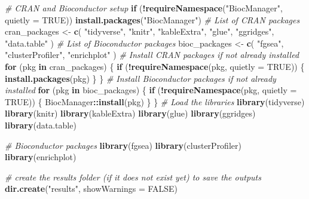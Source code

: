\documentclass[
]{book}
\newenvironment{Shaded}{\begin{snugshade}}{\end{snugshade}}
\newcommand{\AttributeTok}[1]{\textcolor[rgb]{0.13,0.29,0.53}{#1}}
\newcommand{\CommentTok}[1]{\textcolor[rgb]{0.56,0.35,0.01}{\textit{#1}}}
\newcommand{\ConstantTok}[1]{\textcolor[rgb]{0.56,0.35,0.01}{#1}}
\newcommand{\ControlFlowTok}[1]{\textcolor[rgb]{0.13,0.29,0.53}{\textbf{#1}}}
\newcommand{\FunctionTok}[1]{\textcolor[rgb]{0.13,0.29,0.53}{\textbf{#1}}}
\newcommand{\NormalTok}[1]{#1}
\newcommand{\OtherTok}[1]{\textcolor[rgb]{0.56,0.35,0.01}{#1}}
\newcommand{\SpecialCharTok}[1]{\textcolor[rgb]{0.81,0.36,0.00}{\textbf{#1}}}
\newcommand{\StringTok}[1]{\textcolor[rgb]{0.31,0.60,0.02}{#1}}
\begin{document}
\begin{Shaded}
\begin{Highlighting}[]
\CommentTok{\# CRAN and Bioconductor setup}
\ControlFlowTok{if}\NormalTok{ (}\SpecialCharTok{!}\FunctionTok{requireNamespace}\NormalTok{(}\StringTok{"BiocManager"}\NormalTok{, }\AttributeTok{quietly =} \ConstantTok{TRUE}\NormalTok{))}
  \FunctionTok{install.packages}\NormalTok{(}\StringTok{"BiocManager"}\NormalTok{)}
\CommentTok{\# List of CRAN packages}
\NormalTok{cran\_packages }\OtherTok{\textless{}{-}} \FunctionTok{c}\NormalTok{(}
  \StringTok{"tidyverse"}\NormalTok{,}
  \StringTok{"knitr"}\NormalTok{,}
  \StringTok{"kableExtra"}\NormalTok{,}
  \StringTok{"glue"}\NormalTok{,}
  \StringTok{"ggridges"}\NormalTok{,}
  \StringTok{"data.table"}
\NormalTok{)}
\CommentTok{\# List of Bioconductor packages}
\NormalTok{bioc\_packages }\OtherTok{\textless{}{-}} \FunctionTok{c}\NormalTok{(}
  \StringTok{"fgsea"}\NormalTok{,}
  \StringTok{"clusterProfiler"}\NormalTok{,}
  \StringTok{"enrichplot"}
\NormalTok{) }
\CommentTok{\# Install CRAN packages if not already installed}
\ControlFlowTok{for}\NormalTok{ (pkg }\ControlFlowTok{in}\NormalTok{ cran\_packages) \{}
  \ControlFlowTok{if}\NormalTok{ (}\SpecialCharTok{!}\FunctionTok{requireNamespace}\NormalTok{(pkg, }\AttributeTok{quietly =} \ConstantTok{TRUE}\NormalTok{)) \{}
    \FunctionTok{install.packages}\NormalTok{(pkg)}
\NormalTok{  \}}
\NormalTok{\}}
\CommentTok{\# Install Bioconductor packages if not already installed}
\ControlFlowTok{for}\NormalTok{ (pkg }\ControlFlowTok{in}\NormalTok{ bioc\_packages) \{}
  \ControlFlowTok{if}\NormalTok{ (}\SpecialCharTok{!}\FunctionTok{requireNamespace}\NormalTok{(pkg, }\AttributeTok{quietly =} \ConstantTok{TRUE}\NormalTok{)) \{}
\NormalTok{    BiocManager}\SpecialCharTok{::}\FunctionTok{install}\NormalTok{(pkg)}
\NormalTok{  \}}
\NormalTok{\}}
\CommentTok{\# Load the libraries}
\FunctionTok{library}\NormalTok{(tidyverse)}
\FunctionTok{library}\NormalTok{(knitr)}
\FunctionTok{library}\NormalTok{(kableExtra)}
\FunctionTok{library}\NormalTok{(glue)}
\FunctionTok{library}\NormalTok{(ggridges)}
\FunctionTok{library}\NormalTok{(data.table)}

\CommentTok{\# Bioconductor packages}
\FunctionTok{library}\NormalTok{(fgsea)}
\FunctionTok{library}\NormalTok{(clusterProfiler)}
\FunctionTok{library}\NormalTok{(enrichplot)}

\CommentTok{\# create the results folder (if it does not exist yet) to save the outputs}
\FunctionTok{dir.create}\NormalTok{(}\StringTok{"results"}\NormalTok{, }\AttributeTok{showWarnings =} \ConstantTok{FALSE}\NormalTok{)}
\end{Highlighting}
\end{Shaded}
\end{document}

